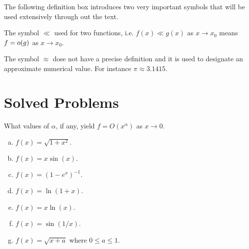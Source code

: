 The following definition box introduces two very important symbols that will be used extensively through out the text. 

\begin{definition} 
	The symbol $ \ll $ used for two functions, i.e. $ f(x) \ll g(x) $ as $ x\to x_0 $ means $ f = o(g) $ as $ x\to x_0 $.  
	
	\noindent The symbol $ \approx $ dose not have a precise definition and it is used to designate an approximate numerical value. For instance $ \pi \approx 3.1415 $.
\end{definition}



\newpage
\section{Solved Problems}
\begin{problem}
	What values of $ \alpha $, if any, yield $ f = O(x^\alpha) $ as $ x \to 0 $.
	\begin{enumerate}[(a),noitemsep]
		\item $ f(x) = \sqrt{1 + x^2}. $
		\item $ f(x) = x \sin(x). $
		\item $ f(x) = (1-e^x)^{-1}. $
		\item $ f(x) = \ln(1+x) $.
		\item $ f(x) = x\ln(x) $.
		\item $ f(x) = \sin(1/x) $.
		\item $ f(x) = \sqrt{x + a} $ where $ 0\leq a \leq 1 $.
	\end{enumerate}
\end{problem}
